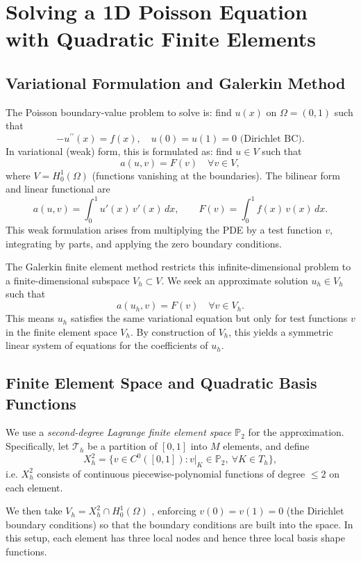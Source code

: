 \documentclass[a4paper,10pt]{article}
\begin{document}

\clearpage

\section[Quadratic FEM for Poisson]{Solving a 1D Poisson Equation with Quadratic Finite Elements}
\subsection{Variational Formulation and Galerkin Method}
The Poisson boundary-value problem to solve is: find \(u(x)\) on \(\Omega=(0,1)\) such that
\[
-u^{\prime\prime}(x) = f(x), \quad u(0)=u(1)=0 \text{ (Dirichlet BC)}.
\]
In variational (weak) form, this is formulated as: find \(u \in V\) such that
\[
a(u,v) = F(v) \quad \forall v \in V,
\]
where \(V = H^1_0(\Omega)\) (functions vanishing at the boundaries).
The bilinear form and linear functional are
\[
a(u,v) = \int_0^1 u'(x)\,v'(x)\,dx, \qquad F(v) = \int_0^1 f(x)\,v(x)\,dx.
\]
This weak formulation arises from multiplying the PDE by a test function \(v\), integrating by parts, and applying the zero boundary conditions.

The Galerkin finite element method restricts this infinite-dimensional problem to a finite-dimensional subspace \(V_h \subset V\). 
We seek an approximate solution \(u_h \in V_h\) such that
\[
a(u_h, v) = F(v) \quad \forall v \in V_h.
\]
This means \(u_h\) satisfies the same variational equation but only for test functions \(v\) in the finite element space \(V_h\). By construction of \(V_h\), this yields a symmetric linear system of equations for the coefficients of \(u_h\).

\subsection{Finite Element Space and Quadratic Basis Functions}
We use a \emph{second-degree Lagrange finite element space \(\mathbb{P}_2\)} for the approximation.
Specifically, let \(\mathcal{T}_h\) be a partition of \([0,1]\) into \(M\) elements, and define
\[
	X_h^2 = \{ v \in C^0([0,1]) : v|_{K} \in \mathbb{P}_2,\ \forall K \in T_h\},
\]
i.e. \(X_h^2\) consists of continuous piecewise-polynomial functions of degree \(\le 2\) on each element.

We then take \(V_h = X_h^2 \cap H^1_0(\Omega)\) , enforcing \(v(0)=v(1)=0\) (the Dirichlet boundary conditions) so that the boundary conditions are built into the space.
In this setup, each element has three local nodes and hence three local basis shape functions.
\end{document}
